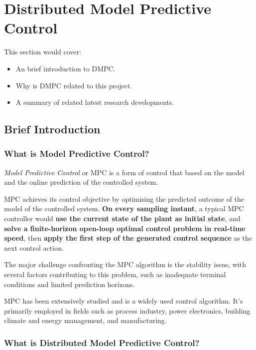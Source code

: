 \section{Distributed Model Predictive Control}

This section would cover:
\begin{itemize}
  \item An brief introduction to DMPC.
  \item Why is DMPC related to this project.
  \item A summary of related latest research developments.
\end{itemize}

\subsection{Brief Introduction}
\subsubsection{What is Model Predictive Control\cite{MPC_Review1}?}

\textit{Model Predictive Control} or MPC is a form of control that based on the model and the online prediction of the controlled system.

MPC achieves its control objective by optimising the predicted outcome of the model of the controlled system\cite{MPC_Review1}.
\textbf{On every sampling instant}, a typical MPC controller would \textbf{use the current state of the plant as initial state}, and \textbf{solve a finite-horizon open-loop optimal control problem in real-time speed}, then \textbf{apply the first step of the generated control sequence} as the next control action.

The major challenge confronting the MPC algorithm is the stability issue, with several factors contributing to this problem, such as inadequate terminal conditions and limited prediction horizons.

MPC has been extensively studied and is a widely used control algorithm\cite{DMPC_Review1}. 
It's primarily employed in fields such as process industry, power electronics, building climate and energy management, and manufacturing\cite{MPC_Applications1, MPC_Applications2}.

\subsubsection{What is Distributed Model Predictive Control? \cite{DMPC_made_easy}}

